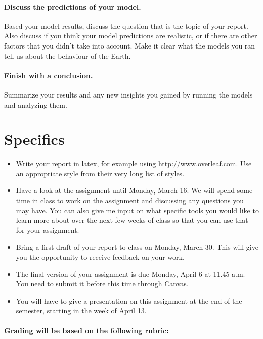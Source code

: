 \documentclass[notitlepage]{article}
\begin{document}
\paragraph{Discuss the predictions of your model.}

Based your model results, discuss the question that is the topic of your report.  
Also discuss if you think your model predictions are realistic, or if there are other factors that you didn't take into account. 
Make it clear what the models you ran tell us about the behaviour of the Earth. 

\paragraph{Finish with a conclusion.}
Summarize your results and any new insights you gained by running the models and analyzing them. 

\section{Specifics}

\begin{itemize}
\item Write your report in latex, for example using \url{http://www.overleaf.com}.  Use an appropriate style from their very long list of styles. 
\item Have a look at the assignment until Monday, March 16. We will spend some time in class to work on the assignment and discussing any questions you may have. You can also give me input on what specific tools you would like to learn more about over the next few weeks of class so that you can use that for your assignment. 
\item Bring a first draft of your report to class on Monday, March 30. This will give you the opportunity to receive feedback on your work.
\item The final version of your assignment is due Monday, April 6 at 11.45 a.m. You need to submit it before this time through Canvas. 
\item You will have to give a presentation on this assignment at the end of the semester, starting in the week of April 13. 
\end{itemize}

\paragraph{Grading will be based on the following rubric:}
\end{document}
